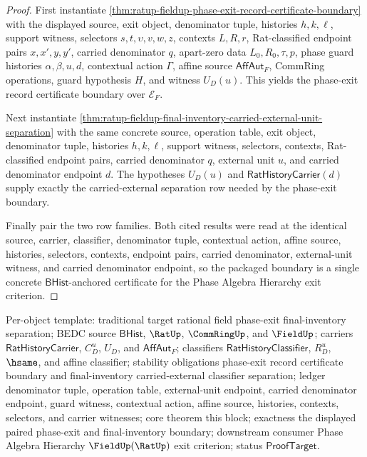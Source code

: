 \begin{proof}
First instantiate
\autoref{thm:ratup-fieldup-phase-exit-record-certificate-boundary} with the
displayed source, exit object, denominator tuple, histories $h,k,\ell$, support
witness, selectors $s,t,\upsilon,v,w,z$, contexts $L,R,r$, Rat-classified
endpoint pairs $x,x',y,y'$, carried denominator $q$, apart-zero data
$L_0,R_0,\tau,p$, phase guard histories $\alpha,\beta,u,d$, contextual action
$\Gamma$, affine source $\mathsf{AffAut}_F$, CommRing operations, guard
hypothesis $H$, and witness $U_D(u)$. This yields the phase-exit record
certificate boundary over $\mathcal E_F$.

Next instantiate
\autoref{thm:ratup-fieldup-final-inventory-carried-external-unit-separation}
with the same concrete source, operation table, exit object, denominator tuple,
histories $h,k,\ell$, support witness, selectors, contexts, Rat-classified
endpoint pairs, carried denominator $q$, external unit $u$, and carried
denominator endpoint $d$. The hypotheses $U_D(u)$ and
$\mathsf{RatHistoryCarrier}(d)$ supply exactly the carried-external separation
row needed by the phase-exit boundary.

Finally pair the two row families. Both cited results were read at the identical
source, carrier, classifier, denominator tuple, contextual action, affine source,
histories, selectors, contexts, endpoint pairs, carried denominator,
external-unit witness, and carried denominator endpoint, so the packaged
boundary is a single concrete $\mathsf{BHist}$-anchored certificate for the
Phase Algebra Hierarchy exit criterion.
\end{proof}

Per-object template: traditional target rational field phase-exit
final-inventory separation; BEDC source $\mathsf{BHist}$, $\RatUp$,
$\CommRingUp$, and $\FieldUp$; carriers $\mathsf{RatHistoryCarrier}$, $C_D^u$,
$U_D$, and $\mathsf{AffAut}_F$; classifiers $\mathsf{RatHistoryClassifier}$,
$R_D^u$, $\hsame$, and affine classifier; stability obligations phase-exit
record certificate boundary and final-inventory carried-external classifier
separation; ledger denominator tuple, operation table, external-unit endpoint,
carried denominator endpoint, guard witness, contextual action, affine source,
histories, contexts, selectors, and carrier witnesses; core theorem this block;
exactness the displayed paired phase-exit and final-inventory boundary;
downstream consumer Phase Algebra Hierarchy $\FieldUp(\RatUp)$ exit criterion;
status $\mathsf{ProofTarget}$.

